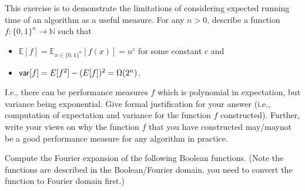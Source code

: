 \documentclass[12pt, a4paper, onecolumn]{exam}
\begin{document}
\begin{questions}

	\question[10]  This exercise is to demonstrate the limitations of considering expected running time of an algorithm as a useful measure. For any $n>0$, describe  a function $f:\{0,1\}^n \to \mathbb{N}$ such that
	\begin{itemize}
		\item $\mathbb{E}[f] = \mathbb{E}_{x\in \{0,1\}^n}[f(x)] = n^c$ for some constant $c$ and
		\item ${\sf var}[f] = E[f^2] - (E[f])^2 = \Omega(2^n)$.
	\end{itemize}
	I.e., there can be performance measures $f$ which is polynomial in expectation, but variance being exponential. Give formal justification for your answer (i.e., computation of expectation and variance for the function $f$ constructed).  Further, write your views on why the function $f$ that you have constructed may/maynot be a good performance measure for any algorithm in practice.

	\question[10]  Compute the Fourier expansion of the following Boolean functions. (Note the functions are described in the Boolean/Fourier domain, you need to convert the function to Fourier domain first.)


\end{questions}
\end{document}
